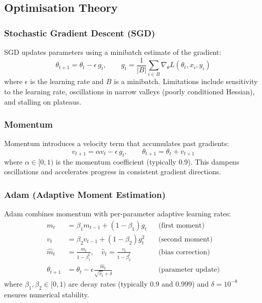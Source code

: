 \documentclass[11pt]{article}
\begin{document}
\subsection{Optimisation Theory}

\subsubsection{Stochastic Gradient Descent (SGD)}

SGD updates parameters using a minibatch estimate of the gradient:
\[
    \theta_{t+1} = \theta_t - \epsilon \, g_t, \qquad
    g_t = \frac{1}{|B|} \sum_{i \in B} \nabla_\theta L(\theta_t, x_i, y_i)
\]
where $\epsilon$ is the learning rate and $B$ is a minibatch. Limitations include sensitivity to the learning rate, oscillations in narrow valleys (poorly conditioned Hessian), and stalling on plateaus.

\subsubsection{Momentum}

Momentum introduces a velocity term that accumulates past gradients:
\[
    v_{t+1} = \alpha v_t - \epsilon \, g_t, \qquad \theta_{t+1} = \theta_t + v_{t+1}
\]
where $\alpha \in [0, 1)$ is the momentum coefficient (typically $0.9$). This dampens oscillations and accelerates progress in consistent gradient directions.

\subsubsection{Adam (Adaptive Moment Estimation)}

Adam combines momentum with per-parameter adaptive learning rates:
\begin{align*}
    m_t &= \beta_1 m_{t-1} + (1 - \beta_1) g_t & &\text{(first moment)}\\
    v_t &= \beta_2 v_{t-1} + (1 - \beta_2) g_t^2 & &\text{(second moment)}\\
    \hat{m}_t &= \frac{m_t}{1 - \beta_1^t}, \quad \hat{v}_t = \frac{v_t}{1 - \beta_2^t} & &\text{(bias correction)}\\
    \theta_{t+1} &= \theta_t - \epsilon \frac{\hat{m}_t}{\sqrt{\hat{v}_t} + \delta} & &\text{(parameter update)}
\end{align*}
where $\beta_1, \beta_2 \in [0, 1)$ are decay rates (typically $0.9$ and $0.999$) and $\delta = 10^{-8}$ ensures numerical stability.
\end{document}
